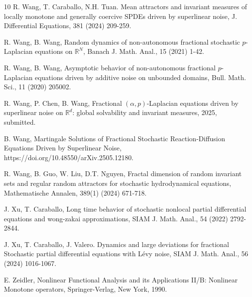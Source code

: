 \documentclass[11pt]{article}
\numberwithin{equation}{section}
\begin{document}
\begin{thebibliography}{10}
R. Wang, T. Caraballo, N.H. Tuan. Mean attractors and invariant measures of locally monotone and generally coercive SPDEs driven by superlinear noise, J. Differential Equations, 381 (2024) 209-259.

R. Wang, B. Wang, Random dynamics of non-autonomous fractional stochastic $p$-Laplacian equations on $\mathbb {R}^N$,  Banach J. Math. Anal., 15 (2021) 1-42.

 R. Wang, B. Wang, Asymptotic behavior of non-autonomous fractional
$p$-Laplacian equations driven by additive noise on unbounded domains, Bull. Math. Sci.,  11 (2020) 205002.

R. Wang, P. Chen, B. Wang,
Fractional $(\alpha, p)$-Laplacian equations driven by superlinear noise
on $\mathbb{R}^d$: global solvability and invariant measures, 2025, submitted.

B. Wang,
Martingale Solutions of Fractional Stochastic Reaction-Diffusion Equations Driven by Superlinear Noise,
https://doi.org/10.48550/arXiv.2505.12180.



R. Wang, B. Guo, W. Liu, D.T. Nguyen, Fractal
dimension of random invariant sets and regular random attractors for
stochastic hydrodynamical equations, Mathematische Annalen, 389(1) (2024) 671-718.



 J. Xu, T. Caraballo, Long time behavior of stochastic nonlocal partial differential equations and wong-zakai
approximations, SIAM J. Math. Anal.,  54 (2022) 2792-2844.

J. Xu, T. Caraballo, J. Valero. Dynamics and large deviations for fractional Stochastic partial differential equations with L\'{e}vy noise, SIAM J. Math. Anal.,  56 (2024) 1016-1067.

E. Zeidler, Nonlinear Functional Analysis and its Applications II/B: Nonlinear Monotone
operators, Springer-Verlag, New York, 1990.

\end{thebibliography}
\end{document}
